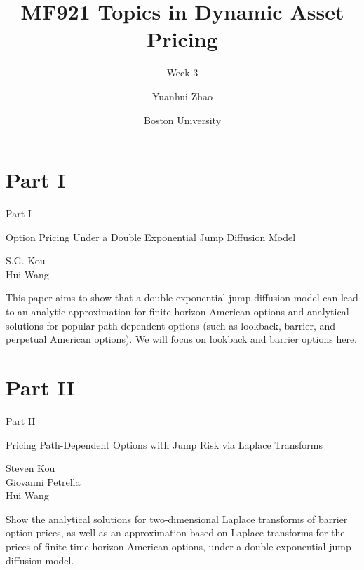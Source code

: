 \documentclass{beamer}
\title{MF921 Topics in Dynamic Asset Pricing}
\subtitle{Week 3}
\author{Yuanhui Zhao}
\date{Boston University}
\begin{document}
\frame{\titlepage}
\section{Part I}
\begin{frame}{Part I}
    \begin{center}
        Option Pricing Under a Double Exponential Jump Diffusion Model
    \end{center}
    \vspace{2em}
    \begin{center}
        S.G. Kou\\
        Hui Wang
    \end{center}
    \vspace{3em}
    \par This paper aims to show that a double exponential jump diffusion model can lead to an analytic approximation for finite-horizon
    American options and analytical solutions for popular path-dependent options (such as lookback, barrier, and perpetual American options). We will focus on lookback and barrier options here.
 \end{frame}

 \section{Part II}
\begin{frame}{Part II}

    \begin{center}
        Pricing Path-Dependent Options with Jump Risk via Laplace Transforms
    \end{center}
    \vspace{2em}
    \begin{center}
        Steven Kou\\
        Giovanni Petrella\\
        Hui Wang
    \end{center}
    \vspace{3em}
    \par  Show the analytical solutions for two-dimensional Laplace transforms of barrier option prices,
     as well as an approximation based on Laplace transforms for the prices of finite-time horizon American options, under a double exponential jump diffusion model.
    
\end{frame}
\end{document}
